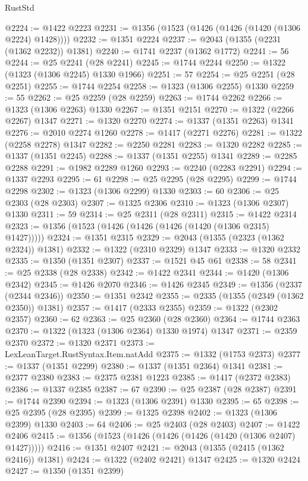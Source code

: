 \begin{lexlean}{RustStd}
\begin{coremodule}
@2224 := @1422 @2223
@2231 := @1356 (@1523 (@1426 (@1426 (@1420 (@1306 @2224) @1428))))
@2232 := @1351 @2224
@2237 := @2043 (@1355 (@2231 (@1362 @2232)) @1381)
@2240 := @1741 @2237 (@1362 @1772)
@2241 := 56
@2244 := @25 @2241 (@28 @2241)
@2245 := @1744 @2244
@2250 := @1322 (@1323 (@1306 @2245) @1330 @1966)
@2251 := 57
@2254 := @25 @2251 (@28 @2251)
@2255 := @1744 @2254
@2258 := @1323 (@1306 @2255) @1330
@2259 := 55
@2262 := @25 @2259 (@28 @2259)
@2263 := @1744 @2262
@2266 := @1323 (@1306 @2263) @1330
@2267 := @1351 @2151
@2270 := @1322 (@2266 @2267) @1347
@2271 := @1320 @2270
@2274 := @1337 (@1351 @2263) @1341
@2276 := @2010 @2274 @1260
@2278 := @1417 (@2271 @2276)
@2281 := @1322 (@2258 @2278) @1347
@2282 := @2250 @2281
@2283 := @1320 @2282
@2285 := @1337 (@1351 @2245)
@2288 := @1337 (@1351 @2255) @1341
@2289 := @2285 @2288
@2291 := @1982 @2289 @1260
@2293 := @2240 (@2283 @2291)
@2294 := @1337 @2293
@2295 := 61
@2298 := @25 @2295 (@28 @2295)
@2299 := @1744 @2298
@2302 := @1323 (@1306 @2299) @1330
@2303 := 60
@2306 := @25 @2303 (@28 @2303)
@2307 := @1325 @2306
@2310 := @1323 (@1306 @2307) @1330
@2311 := 59
@2314 := @25 @2311 (@28 @2311)
@2315 := @1422 @2314
@2323 := @1356 (@1523 (@1426 (@1426 (@1426 (@1420 (@1306 @2315) @1427)))))
@2324 := @1351 @2315
@2329 := @2043 (@1355 (@2323 (@1362 @2324)) @1381)
@2332 := @1322 (@2310 @2329) @1347
@2333 := @1320 @2332
@2335 := @1350 (@1351 @2307)
@2337 := @1521 @45 @61
@2338 := 58
@2341 := @25 @2338 (@28 @2338)
@2342 := @1422 @2341
@2344 := @1420 (@1306 @2342)
@2345 := @1426 @2070
@2346 := @1426 @2345
@2349 := @1356 (@2337 (@2344 @2346))
@2350 := @1351 @2342
@2355 := @2335 (@1355 (@2349 (@1362 @2350)) @1381)
@2357 := @1417 (@2333 @2355)
@2359 := @1322 (@2302 @2357)
@2360 := 62
@2363 := @25 @2360 (@28 @2360)
@2364 := @1744 @2363
@2370 := @1322 (@1323 (@1306 @2364) @1330 @1974) @1347
@2371 := @2359 @2370
@2372 := @1320 @2371
@2373 := LexLeanTarget.RustSyntax.Item.natAdd
@2375 := @1332 (@1753 @2373)
@2377 := @1337 (@1351 @2299)
@2380 := @1337 (@1351 @2364) @1341
@2381 := @2377 @2380
@2383 := @2375 @2381 @1223
@2385 := @1417 (@2372 @2383)
@2386 := @1337 @2385
@2387 := 67
@2390 := @25 @2387 (@28 @2387)
@2391 := @1744 @2390
@2394 := @1323 (@1306 @2391) @1330
@2395 := 65
@2398 := @25 @2395 (@28 @2395)
@2399 := @1325 @2398
@2402 := @1323 (@1306 @2399) @1330
@2403 := 64
@2406 := @25 @2403 (@28 @2403)
@2407 := @1422 @2406
@2415 := @1356 (@1523 (@1426 (@1426 (@1426 (@1420 (@1306 @2407) @1427)))))
@2416 := @1351 @2407
@2421 := @2043 (@1355 (@2415 (@1362 @2416)) @1381)
@2424 := @1322 (@2402 @2421) @1347
@2425 := @1320 @2424
@2427 := @1350 (@1351 @2399)

\end{coremodule}
\end{lexlean}
